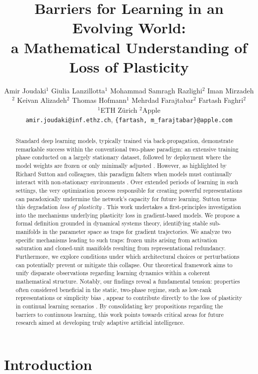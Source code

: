 \documentclass{article}
\title{Barriers for Learning in an Evolving World: \\a Mathematical Understanding of Loss of Plasticity}
\author{%
  Amir Joudaki$^{1}$ \And
  Giulia Lanzillotta$^{1}$ \And
  Mohammad Samragh Razlighi$^{2}$ \And
  Iman Mirzadeh$^{2}$ \And
  Keivan Alizadeh$^{2}$ \And
  Thomas Hofmann$^{1}$ \And
  Mehrdad Farajtabar$^{2}$ \And
  Fartash Faghri$^{2}$ %
  \\
  $^{1}$ETH Zürich
  $^{2}$Apple \\
  \texttt{amir.joudaki@inf.ethz.ch},
  \texttt{\{fartash, m\_farajtabar\}@apple.com}
}
\begin{document}
\maketitle

\begin{abstract}
Standard deep learning models, typically trained via back-propagation, demonstrate remarkable success within the conventional two-phase paradigm: an extensive training phase conducted on a largely stationary dataset, followed by deployment where the model weights are frozen or only minimally adjusted \cite{dohare2024loss}. However, as highlighted by Richard Sutton and colleagues, this paradigm falters when models must continually interact with non-stationary environments \cite{dohare2024loss}. Over extended periods of learning in such settings, the very optimization process responsible for creating powerful representations can paradoxically undermine the network's capacity for future learning. Sutton terms this degradation \emph{loss of plasticity} \cite{dohare2024loss}. This work undertakes a first-principles investigation into the mechanisms underlying plasticity loss in gradient-based models. We propose a formal definition grounded in dynamical systems theory, identifying stable sub-manifolds in the parameter space as traps for gradient trajectories. We analyze two specific mechanisms leading to such traps: frozen units arising from activation saturation and cloned-unit manifolds resulting from representational redundancy. Furthermore, we explore conditions under which architectural choices or perturbations can potentially prevent or mitigate this collapse. Our theoretical framework aims to unify disparate observations regarding learning dynamics within a coherent mathematical structure. Notably, our findings reveal a fundamental tension: properties often considered beneficial in the static, two-phase regime, such as low-rank representations or simplicity bias \cite{huh2022lowrank, papyan2020prevalence}, appear to contribute directly to the loss of plasticity in continual learning scenarios \cite{dohare2024loss}. By consolidating key propositions regarding the barriers to continuous learning, this work points towards critical areas for future research aimed at developing truly adaptive artificial intelligence.
\end{abstract}

\section{Introduction}
\end{document}
